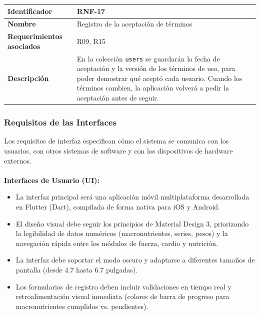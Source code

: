\begin{table}[h!]
    \centering
    \renewcommand{\arraystretch}{1.3}
    \begin{tabular}{|p{3.5cm}|p{11.5cm}|}
        \hline
        \rowcolor[HTML]{EFEFEF}
        \textbf{Identificador} & \textbf{RNF-17} \\ \hline
        \textbf{Nombre} & Registro de la aceptación de términos \\ \hline
        \textbf{Requerimientos asociados} & R09, R15 \\ \hline
        \textbf{Descripción} & En la colección \texttt{users} se guardarán la fecha de aceptación y la versión de los términos de uso, para poder demostrar qué aceptó cada usuario. Cuando los términos cambien, la aplicación volverá a pedir la aceptación antes de seguir. \\ \hline
    \end{tabular}
\end{table}

\subsubsection{Requisitos de las Interfaces}
Los requisitos de interfaz especifican cómo el sistema se comunica con los usuarios, con otros sistemas de software y con los dispositivos de hardware externos.
\\\\
\textbf{Interfaces de Usuario (UI):}
\begin{itemize}
    \item La interfaz principal será una aplicación móvil multiplataforma desarrollada en Flutter (Dart), compilada de forma nativa para iOS y Android.
    \item El diseño visual debe seguir los principios de Material Design 3, priorizando la legibilidad de datos numéricos (macronutrientes, series, pesos) y la navegación rápida entre los módulos de fuerza, cardio y nutrición.
    \item La interfaz debe soportar el modo oscuro y adaptarse a diferentes tamaños de pantalla (desde 4.7 hasta 6.7 pulgadas).
    \item Los formularios de registro deben incluir validaciones en tiempo real y retroalimentación visual inmediata (colores de barra de progreso para macronutrientes cumplidos vs. pendientes).
\end{itemize}

